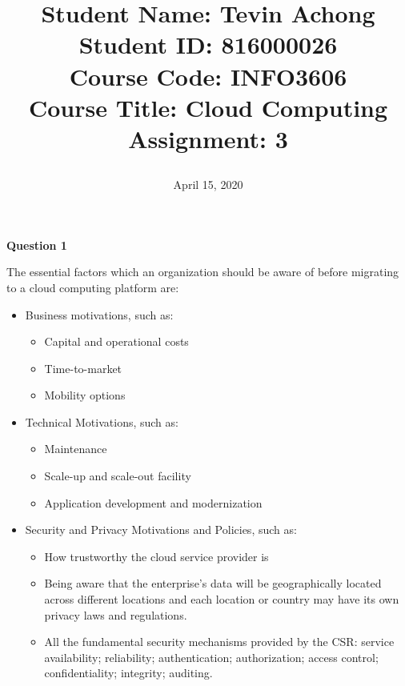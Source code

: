 \documentclass[a4paper, 12pt]{article}
\begin{document}
\title{
		\textbf{Student Name:} Tevin Achong\\
		\textbf{Student ID:} 816000026\\
		\textbf{Course Code:} INFO3606\\
		\textbf{Course Title:} Cloud Computing\\
		\textbf{Assignment:} 3
		\date{April 15, 2020}
}
\maketitle

\newpage
{}

\begin{center}
	\textbf{Question 1}
\end{center}
The essential factors which an organization should be aware of before migrating to a cloud computing platform are:
\begin{itemize}
\item
Business motivations, such as:
\begin{itemize}
\item
Capital and operational costs
\item
Time-to-market
\item
Mobility options
\end{itemize}

\item
Technical Motivations, such as:
\begin{itemize}
\item
Maintenance
\item
Scale-up and scale-out facility
\item
Application development and modernization
\end{itemize}

\item
Security and Privacy Motivations and Policies, such as:
\begin{itemize}
\item
How trustworthy the cloud service provider is
\item
Being aware that the enterprise's data will be geographically located across different locations and each location or country may have its own privacy laws and regulations.
\item
All the fundamental security mechanisms provided by the CSR: service availability; reliability; authentication; authorization; access control; confidentiality; integrity; auditing.
\end{itemize}
\end{itemize}
\end{document}
